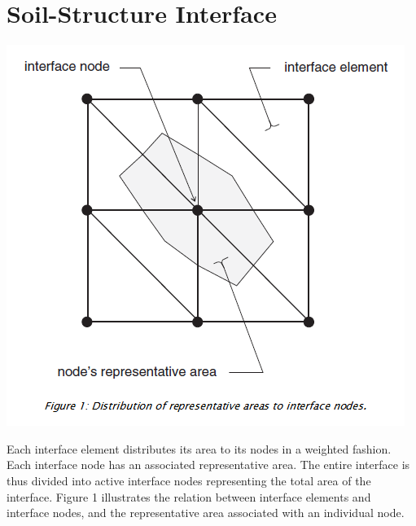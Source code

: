 \documentclass[a4paper, nobind]{templates/ociamthesis}
\begin{document}
\hypertarget{soil-structure-interface}{%
\section{Soil-Structure Interface}\label{soil-structure-interface}}

\includegraphics[width=1\linewidth]{myfigureeeeee/interface-formulation}

Each interface element distributes its area to its nodes in a weighted fashion. Each interface node has an associated representative area. The entire interface is thus divided into active interface nodes representing the total area of the interface. Figure 1 illustrates the relation between interface elements and interface nodes, and the representative area associated with an individual node.
\end{document}
